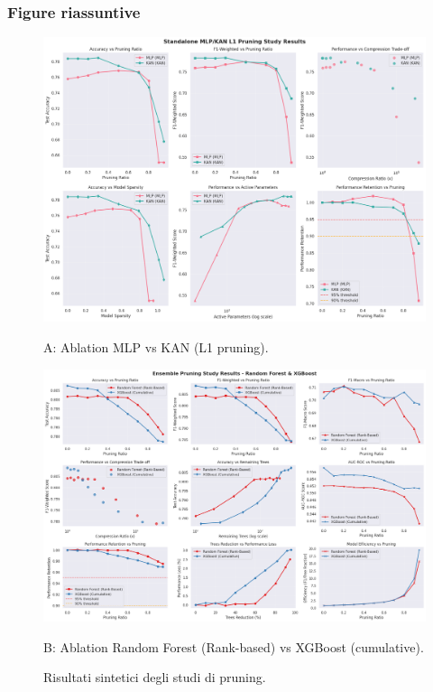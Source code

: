 \documentclass[a4paper,12pt]{report}
\begin{document}
	\subsubsection{Figure riassuntive}
	\begin{figure}[H]
		\centering
		\begin{minipage}{0.49\textwidth}
			\centering
			\includegraphics[width=\linewidth]{img/abl_kanvsmlp_pm.png}
			\caption*{A: Ablation MLP vs KAN (L1 pruning).}
		\end{minipage}\hfill
		\begin{minipage}{0.49\textwidth}
			\centering
			\includegraphics[width=\linewidth]{img/abl_xgbvsrf_pm.png}
			\caption*{B: Ablation Random Forest (Rank-based) vs XGBoost (cumulative).}
		\end{minipage}
		\caption{Risultati sintetici degli studi di pruning.}
	\end{figure}
	
\end{document}
